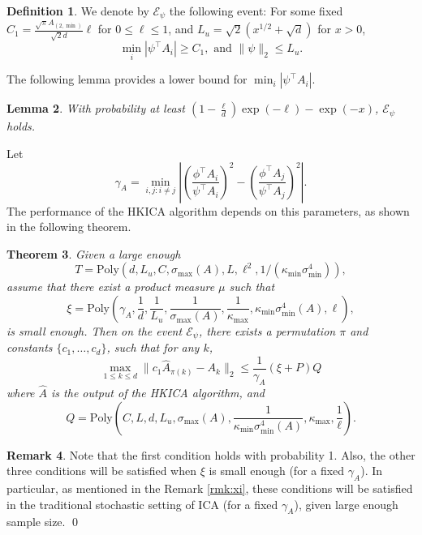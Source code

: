 \documentclass[twoside]{article}
\newcommand{\Epsi}{\mathcal{E}_{\psi}}
\newtheorem{lemma}{Lemma}[section]
\newtheorem{thm}[lemma]{Theorem}
\theoremstyle{definition}
\newtheorem{definition}[lemma]{Definition}
\newtheorem{remark}[lemma]{Remark}
\begin{document}
\begin{definition}
We denote by $\Epsi$ the following event: For some fixed $C_1 = \frac{\sqrt{\pi}A_{(2,\min)}}{\sqrt{2}d} \ell$ for $0\le \ell\le 1$, and $ L_u = \sqrt{2}\left(x^{1/2}+\sqrt{d}\right)$ for $x>0$,
\[\min_i |\psi^{\top}A_i| \ge C_1, \text{ and } \|\psi\|_2 \le L_u.\] 
\end{definition}
The following lemma provides a lower bound for $\min_i |\psi^{\top}A_i|$.
\begin{lemma}
\label{lem:dmin}
With probability at least $\left(1- \frac{\ell}{d}\right)\exp(-\ell) - \exp(-x)$, $\Epsi$ holds.
\end{lemma}
Let 
\begin{equation}
\label{def:kappa}
\gamma_A =  \min_{i,j: i\neq j} \left\vert \left(\frac{\phi^{\top}A_i}{\psi^{\top}A_i}\right)^2 - \left(\frac{\phi^{\top}A_j}{\psi^{\top}A_j}\right)^2 \right\vert. 
\end{equation}
The performance of the HKICA algorithm depends on this parameters, as shown in the following theorem.
\begin{thm}
 \label{thm:efficiency} 
Given a large enough 
\[T = \text{Poly}(d, L_u, C, \sigma_{\max}(A), L, \ell^2, 1/(\kappa_{\min}\sigma_{\min}^4)),\]
assume that there exist a product measure $\mu$ such that 
\[\xi=\text{Poly}(\gamma_A, \frac{1}{d}, \frac{1}{L_u}, \frac{1}{\sigma_{\max}(A)}, \frac{1}{\kappa_{\max}}, \kappa_{\min}\sigma^4_{\min}(A), \ell),\] 
is small enough.
 Then on the event $\Epsi$, there exists a permutation $\pi$ and constants $\{c_1,\ldots,c_d\}$, such that for any $k$,
 \[
  \max_{1\le k\le d}\| c_1\widehat{A}_{\pi(k)} - A_k\|_2 \le
  \frac{1}{\gamma_A} (\xi + P)Q
\]
where $\widehat{A}$ is the output of the HKICA algorithm, and \[Q=\text{Poly}(C, L, d, L_u, \sigma_{\max}(A), \frac{1}{\kappa_{\min}\sigma^4_{\min}(A)}, \kappa_{\max}, \frac{1}{\ell}).\]
 \end{thm}
\begin{remark}
Note that the first condition holds with probability 1. Also, the other three conditions will be satisfied when $\xi$ is small enough (for a fixed $\gamma_A$).
In particular, as mentioned in the Remark \ref{rmk:xi}, these conditions will be satisfied in the traditional stochastic setting of ICA (for a fixed $\gamma_A$), given large enough sample size. \qed
\end{remark}
\end{document}
